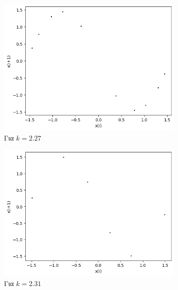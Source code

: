 \begin{figure}[ht]
	\centering
	\begin{subfigure}[b]{0.4\textwidth}
		\centering
		\includegraphics[width=\textwidth]{LateX images/sine q=-0.3/g3}
		\caption{Για $k=2.27$}
		\label{f:k116}
	\end{subfigure}
	\hfill
	\begin{subfigure}[b]{0.4\textwidth}
		\centering
		\includegraphics[width=\textwidth]{LateX images/sine q=-0.3/g4}
		\caption{Για $k=2.31$}
		\label{f:k117}
	\end{subfigure}
	\hfill
	\begin{subfigure}[b]{0.4\textwidth}
		\centering

\end{subfigure}
\end{figure}
